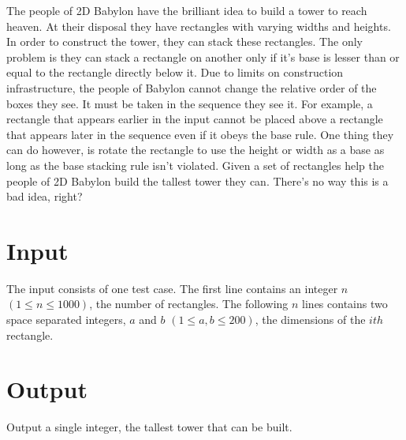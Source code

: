 
The people of 2D Babylon have the brilliant idea to build a tower to reach heaven. 
At their disposal they have rectangles with varying widths and heights. In order to construct the 
tower, they can stack these rectangles. The only problem is they can stack a rectangle on another 
only if it's base is lesser than or equal to the rectangle directly below it. Due to limits on construction infrastructure,
the people of Babylon cannot change the relative order of the boxes they see. It must be taken in the sequence they 
see it. For example, a rectangle that appears earlier in the input cannot be placed above a rectangle 
that appears later in the sequence even if it obeys the base rule. One thing they can do however, is rotate the rectangle 
to use the height or width as a base as long as the base stacking rule isn't violated. Given a set of rectangles 
help the people of 2D Babylon build the tallest tower they can. There's no way this is a bad idea, right?

\section*{Input}

The input consists of one test case. The first line contains an integer $n$ $(1 \le n \le 1000)$, the number of rectangles. 
The following $n$ lines contains two space separated integers, $a$ and $b$ $(1 \le a, b \le 200)$, the dimensions
of the $ith$ rectangle.

\section*{Output}

Output a single integer, the tallest tower that can be built.